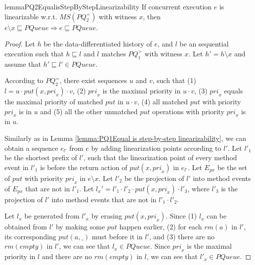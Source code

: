 \begin{restatable}{lemma}{PQ2EqualisStepByStepLinearizability}
\label{lemma:PQ2Equal is step-by-step linearizability}
If concurrent execution $e$ is linearizable w.r.t. $\textit{MS}(\textit{PQ}_2^{=})$ with witness $x$, then $e \setminus x \sqsubseteq \textit{PQueue} \Rightarrow e \sqsubseteq \textit{PQueue}$.
\end{restatable}

\begin {proof}
Let $h$ be the data-differentiated history of $e$, and $l$ be an sequential execution such that $h \sqsubseteq l$ and $l$ matches $\textit{PQ}_1^{>}$ with witness $x$. Let $h'=h \setminus x$ and assume that $h' \sqsubseteq l' \in \textit{PQueue}$.

According to $\textit{PQ}_2^{=}$, there exist sequences $u$ and $v$, such that (1) $l=u \cdot \textit{put}(x,\textit{pri}_x) \cdot v$, (2) $\textit{pri}_x$ is the maximal priority in $u \cdot v$, (3) $\textit{pri}_x$ equals the maximal priority of matched $\textit{put}$ in $u \cdot v$, (4) all matched $\textit{put}$ with priority $\textit{pri}_x$ is in $u$ and (5) all the other unmatched $\textit{put}$ operations with priority $\textit{pri}_x$ is in $u$.

Similarly as in Lemma \ref{lemma:PQ1Equal is step-by-step linearizability}, we can obtain a sequence $e_{l'}$ from $e$ by adding linearization points according to $l'$. Let $l'_1$ be the shortest prefix of $l'$, such that the linearization point of every method event in $l'_1$ is before the return action of $\textit{put}(x,\textit{pri}_x)$ in $e_{l'}$. Let $E_{px}$ be the set of $\textit{put}$ with priority $\textit{pri}_x$ in $e \setminus x$. Let $l'_2$ be the projection of $l'$ into method events of $E_{px}$ that are not in $l'_1$. Let $l_x' = l'_1 \cdot l'_2 \cdot \textit{put}(x,\textit{pri}_x) \cdot l'_3$, where $l'_3$ is the projection of $l'$ into method events that are not in $l'_1 \cdot l'_2$.

Let $l_x$ be generated from $l'_x$ by erasing $\textit{put}(x,\textit{pri}_x)$. Since (1) $l_x$ can be obtained from $l'$ by making some $\textit{put}$ happen earlier, (2) for each $\textit{rm}(a)$ in $l'$, its corresponding $\textit{put}(a,\_)$ must before it in $l'$, and (3) there are no $\textit{rm}(\textit{empty})$ in $l'$, we can see that $l_x \in \textit{PQueue}$. Since $\textit{pri}_x$ is the maximal priority in $l$ and there are no $\textit{rm}(\textit{empty})$ in $l$, we can see that $l'_x \in \textit{PQueue}$.


\end{proof}
